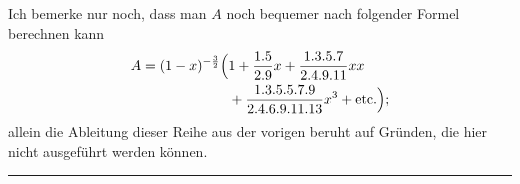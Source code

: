 Ich bemerke nur noch, dass man \(A\) noch bequemer nach folgender Formel berechnen kann
\[
\begin{aligned}
A=(1-x)^{-\frac32}\Bigl(&1+\frac{1.5}{2.9}x+\frac{1.3.5.7}{2.4.9.11}xx\\
&+\frac{1.3.5.5.7.9}{2.4.6.9.11.13}x^3+\text{etc.}\Bigr);
\end{aligned}
\]
allein die Ableitung dieser Reihe aus der vorigen beruht auf Gründen, die hier nicht ausgeführt werden können\HistoricalNoteEight{Vgl. Band III S. 209.]}.
\begin{center}\rule{.18\textwidth}{.35pt}\end{center}
